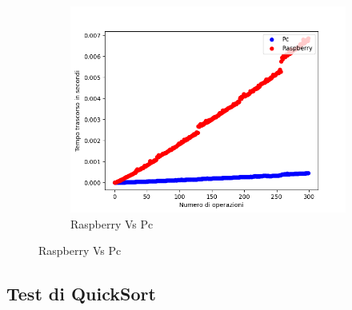 \documentclass{article}
\begin{document}
\begin{figure}[h!]
\begin{subfigure}{0.6\textwidth}
					\includegraphics[width = \textwidth]{./Plots/PcVsRaspberry_MergeSort.png}
					\caption{Raspberry Vs Pc}
				\end{subfigure}
				
			\end{figure}
		
		\clearpage
		\subsection{Test di QuickSort}
\end{document}
